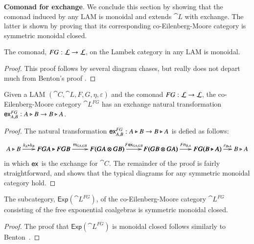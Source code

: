 \textbf{Comonad for exchange}.  We conclude this section by showing
that the comonad induced by any LAM is monoidal and extends $\cat{L}$
with exchange.  The latter is shown by proving that its corresponding
co-Eilenberg-Moore category is symmetric monoidal closed.

\begin{lemma}
  The comonad, $FG : \mathcal{L} \rightarrow \mathcal{L}$, on the Lambek category in any LAM is monoidal.
\end{lemma}
\begin{proof}
  This proof follows by several diagram chases, but really does not
  depart much from Benton's proof \cite{Benton:1994}.
\end{proof}

\begin{theorem}
  \label{thm:em-exchange}
  Given a LAM $(\cat{C},\cat{L},F,G,\eta,\varepsilon)$ and the comonad
  $FG : \mathcal{L} \rightarrow \mathcal{L}$, the co-Eilenberg-Moore category
  $\cat{L}^{FG}$ has an exchange natural transformation $\mathsf{ex}_{A,B}^{FG}:A\triangleright
  B\rightarrow B\triangleright A$.
\end{theorem}
\begin{proof}
  The natural transformation $\mathsf{ex}_{A,B}^{FG}:A\triangleright B\rightarrow B\triangleright A$ is defied
  as follows:
  $$\bfig
    \morphism<600,0>[A\tri B`FGA\tri FGB;h_A\tri h_B]
    \morphism(600,0)<800,0>[FGA\tri FGB`F(GA\otimes GB);\m{GA,GB}]
    \morphism(1400,0)<800,0>[F(GA\otimes GB)`F(GB\otimes GA);F\e{GA,GB}]
    \morphism(2200,0)<700,0>[F(GB\otimes GA)`FG(B\tri A);F\n{B,A}]
    \morphism(2900,0)<500,0>[FG(B\tri A)`B\tri A;\varepsilon_{B\tri A}]
  \efig$$
  in which $\mathsf{ex}_{}$ is the exchange for $\cat{C}$.  The remainder of the
  proof is fairly straightforward, and shows that the typical diagrams
  for any symmetric monoidal category hold.
\end{proof}

\begin{corollary}
  The subcategory, $\mathsf{Exp}(\cat{L}^{FG})$, of the
  co-Eilenberg-Moore category $\cat{L}^{FG}$ consisting of the free
  exponential coalgebras is symmetric monoidal closed.
\end{corollary}
\begin{proof}
  The proof that $\mathsf{Exp}(\cat{L}^{FG})$ is monoidal closed
  follows similarly to Benton~\cite{Benton:1994}.
\end{proof}


